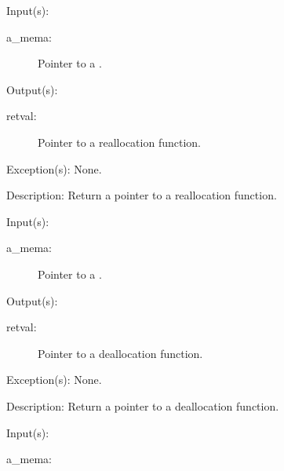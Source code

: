 \begin{capi}
\label{mema_realloc_get}
	\begin{capilist}
	\item[Input(s): ]
		\begin{description}\item[]
		\item[a\_mema: ]
			Pointer to a .
		\end{description}
	\item[Output(s): ]
		\begin{description}\item[]
		\item[retval: ]
			Pointer to a reallocation function.
		\end{description}
	\item[Exception(s): ] None.
	\item[Description: ]
		Return a pointer to a reallocation function.
	\end{capilist}
\label{mema_dealloc_get}
	\begin{capilist}
	\item[Input(s): ]
		\begin{description}\item[]
		\item[a\_mema: ]
			Pointer to a \classname{mema}.
		\end{description}
	\item[Output(s): ]
		\begin{description}\item[]
		\item[retval: ]
			Pointer to a deallocation function.
		\end{description}
	\item[Exception(s): ] None.
	\item[Description: ]
		Return a pointer to a deallocation function.
	\end{capilist}
\label{mema_arg_get}
	\begin{capilist}
	\item[Input(s): ]
		\begin{description}\item[]
		\item[a\_mema: ]

\end{description}
\end{capilist}
\end{capi}
